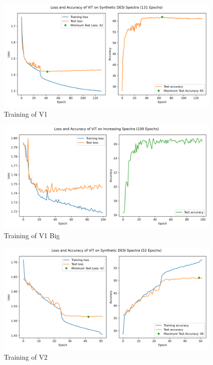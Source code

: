 \begin{figure}
    \centering
    \includegraphics[width = \linewidth]{figures/v1/vit_model_V1_original_redotraining_after.png}
    \caption{Training of V1}
    \label{fig:vit1_training}
\end{figure}



\begin{figure}
    \centering
    \includegraphics[width = \linewidth]{figures/v1/vit_model_V1_bigtraining_after.png}
    \caption{Training of V1 Big}
    \label{fig:vit1_big_training}
\end{figure}


\begin{figure}
    \centering
    \includegraphics[width = \linewidth]{figures/v2/vit_model_V2training_after.png}
    \caption{Training of V2}
    \label{fig:vit2_training}
\end{figure}
